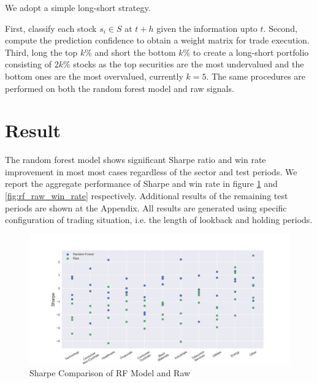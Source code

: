\documentclass[12pt]{article}
\begin{document}
We adopt a simple long-short strategy.

First, classify each stock $s_i \in S$ at $t+h$ given the information upto $t$. Second, compute the prediction confidence to obtain a weight matrix for trade execution. Third, long the top $k\%$ and short the bottom $k\%$ to create a long-short portfolio consisting of $2k\%$ stocks as the top securities are the most undervalued and the bottom ones are the most overvalued, currently $k = 5$. The same procedures are performed on both the random forest model and raw signals.


\section{Result}

The random forest model shows significant Sharpe ratio and win rate improvement in most most cases regardless of the sector and test periods. We report the aggregate performance of Sharpe and win rate in figure \ref{fig:rf_raw_sharpe} and \ref{fig:rf_raw_win_rate} respectively. Additional results of the remaining test periods are shown at the Appendix. All results are generated using specific configuration of trading situation, i.e. the length of lookback and holding periods.

\begin{figure}[ht]
  \begin{center}
    \includegraphics[width=1\linewidth]{figure/rf_raw_sharpe.png}
  \end{center}
  \caption{Sharpe Comparison of RF Model and Raw}
  \label{fig:rf_raw_sharpe}
\end{figure}
\end{document}

